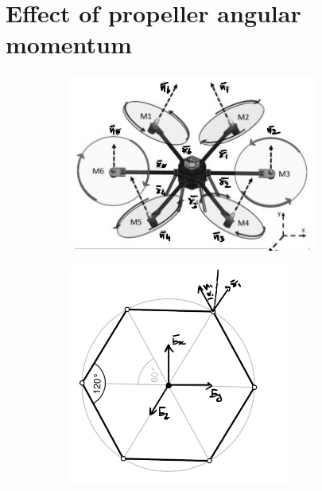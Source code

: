 \section{Effect of propeller angular momentum}
\begin{figure}[h]
    \begin{minipage}{0.49\textwidth}
        \begin{figure}[H]
            \centering
            \includegraphics[width = 0.9\textwidth]{Part2/figs/1_figs/prop_momentum/hex_copt-1.jpg}
        \end{figure}
    \end{minipage}
        \begin{minipage}{0.49\textwidth}
        \begin{figure}[H]
            \centering
            \includegraphics[width = 0.8\textwidth]{Part2/figs/1_figs/prop_momentum/hex_copt-2.png}
        \end{figure}
    \end{minipage}
\end{figure}
%
